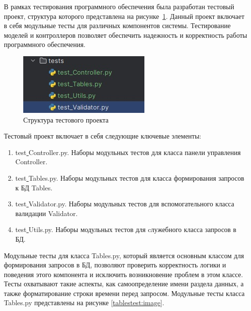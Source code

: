 В рамках тестирования программного обеспечения была разработан тестовый проект, структура которого представлена на рисунке~\ref{fig:test1}. Данный проект включает в себя модульные тесты для различных компонентов системы.
Тестирование моделей и контроллеров позволяет обеспечить надежность и корректность работы программного обеспечения. 
\begin{figure}[H]
	\centering
	\includegraphics[width=0.85\linewidth]{images/test1}
	\caption{Структура тестового проекта}
	\label{fig:test1}
\end{figure}

Тестовый проект включает в себя следующие ключевые элементы:
\begin{enumerate}
	\item test\underline{ }Controller.py. Наборы модульных тестов для класса панели управления Controller.
	\item test\underline{ }Tables.py. Наборы модульных тестов для класса формирования запросов к БД Tables.
	\item test\underline{ }Validator.py. Наборы модульных тестов для вспомогательного класса валидации Validator.
	\item test\underline{ }Utils.py. Наборы модульных тестов для cлужебного класса запросов в БД.
\end{enumerate}

Модульные тесты для класса Tables.py, который является основным классом для формирования запросов в БД, позволяют проверить корректность
логики и поведения этого компонента и исключить возникновение проблем в этом классе. Тесты охватывают такие аспекты, как самоопределение имени раздела данных, а также форматирование строки времени перед запросом.
Модульные тесты класса Tables.py представлены на рисунке \ref{tablestest:image}.

